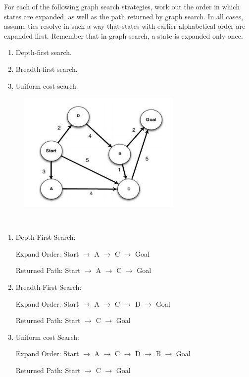 \begin{exercise}[Search]{For each of the following graph search strategies, work out the order in which states are expanded, as well as the path returned by graph search. In all cases, assume ties resolve in such a way that states with earlier alphabetical order are expanded first. Remember that in graph search, a state is expanded only once.
  \begin{enumerate}
    \item Depth-first search.
    \item Breadth-first search.
    \item Uniform cost search.
  \end{enumerate}
  \begin{figure}
    \begin{center}
    \includegraphics[width=8cm]{img/ex1.png}
    \end{center}
  \end{figure}
}
  \begin{solution}
  \par{~}
  \begin{enumerate}
    \item {
      Depth-First Search:

      Expand Order: Start $\rightarrow$ A $\rightarrow$ C $\rightarrow$ Goal

      Returned Path: Start $\rightarrow$ A $\rightarrow$ C $\rightarrow$ Goal
    }
    \item {
      Breadth-First Search:

      Expand Order: Start $\rightarrow$ A $\rightarrow$ C $\rightarrow$ D $\rightarrow$ Goal

      Returned Path: Start $\rightarrow$  C $\rightarrow$ Goal
    }
    \item {
      Uniform cost Search:

      Expand Order: Start $\rightarrow$ A $\rightarrow$ C $\rightarrow$ D $\rightarrow$ B $\rightarrow$ Goal

      Returned Path: Start $\rightarrow$ C $\rightarrow$ Goal
    }
  \end{enumerate}
  \end{solution}
  \label{ex1}
\end{exercise}


